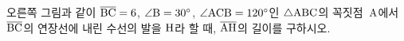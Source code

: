 \noindent\begin{minipage}[t]{0.58\linewidth}\vspace{0pt}\raggedright 오른쪽 그림과 같이 $\overline{\mathrm{BC}}=6$, $\angle\mathrm{B}=30^\circ$, $\angle\mathrm{ACB}=120^\circ$인 $\triangle\mathrm{ABC}$의 꼭짓점~$\mathrm{A}$에서 $\overline{\mathrm{BC}}$의 연장선에 내린 수선의 발을 $\mathrm{H}$라 할 때, $\overline{\mathrm{AH}}$의 길이를 구하시오.\end{minipage}\hfill\begin{minipage}[t]{0.4\linewidth}\vspace{0pt}\centering \resizebox{\ifdim\width>\linewidth\linewidth\else\width\fi}{!}{}\end{minipage}\par
